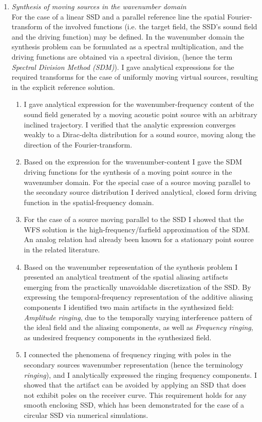 \documentclass[a4paper,10pt]{article}
\begin{document}
\begin{enumerate}
\item \emph{Synthesis of moving sources in the wavenumber domain\\}
For the case of a linear SSD and a parallel reference line the spatial Fourier-transform of the involved functions (i.e. the target field, the SSD's sound field and the driving function) may be defined.
In the wavenumber domain the synthesis problem can be formulated as a spectral multiplication, and the driving functions are obtained via a spectral division, (hence the term \emph{Spectral Division Method (SDM)}).
I gave analytical expressions for the required transforms for the case of uniformly moving virtual sources, resulting in the explicit reference solution.
	\begin{enumerate}
	\item I gave analytical expression for the wavenumber-frequency content of the sound field generated by a moving acoustic point source with an arbitrary inclined trajectory.
	I verified that the analytic expression converges weakly to a Dirac-delta distribution for a sound source, moving along the direction of the Fourier-transform.
	\item Based on the expression for the wavenumber-content I gave the SDM driving functions for the synthesis of a moving point source in the wavenumber domain.
	For the special case of a source moving parallel to the secondary source distribution I derived analytical, closed form driving function in the spatial-frequency domain.
	\item For the case of a source moving parallel to the SSD I showed that the WFS solution is the high-frequency/farfield approximation of the SDM. An analog relation had already been known for a stationary point source in the related literature.
	\item Based on the wavenumber representation of the synthesis problem I presented an analytical treatment of the spatial aliasing artifacts emerging from the practically unavoidable discretization of the SSD.
	By expressing the temporal-frequency representation of the additive aliasing components I identified two main artifacts in the synthesized field: \emph{Amplitude ringing}, due to the temporally varying interference pattern of the ideal field and the aliasing components, as well as \emph{Frequency ringing}, as undesired frequency components in the synthesized field.
	\item I connected the phenomena of frequency ringing with poles in the secondary sources wavenumber representation (hence the terminology \emph{ringing}), and I analytically expressed the ringing frequency components.
	I showed that the artifact can be avoided by applying an SSD that does not exhibit poles on the receiver curve.
	This requirement holds for any smooth enclosing SSD, which has been demonstrated for the case of a circular SSD via numerical simulations.
	\end{enumerate}
\end{enumerate}
\end{document}
